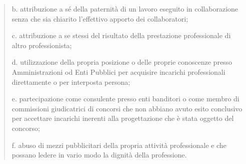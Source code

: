\documentclass[letterpaper,10pt,italian]{sphinxmanual}
\begin{document}
\begin{description}
\begin{quote}
\begin{enumerate}
\end{enumerate}

\sphinxAtStartPar
b. attribuzione a sé della paternità di un lavoro eseguito in
collaborazione senza che sia chiarito l’effettivo apporto dei
collaboratori;

\sphinxAtStartPar
c. attribuzione a se stessi del risultato della prestazione professionale
di altro professionista;

\sphinxAtStartPar
d. utilizzazione della propria posizione o delle proprie conoscenze
presso Amministrazioni od Enti Pubblici per acquisire incarichi
professionali direttamente o per interposta persona;

\sphinxAtStartPar
e. partecipazione come consulente presso enti banditori o come membro di commissioni giudicatrici di concorsi che non abbiano avuto esito conclusivo per accettare incarichi inerenti alla
progettazione che è stata oggetto del concorso;

\sphinxAtStartPar
f. abuso di mezzi pubblicitari della propria attività professionale e che
possano ledere in vario modo la dignità della professione.
\end{quote}

\end{description}
\end{document}
